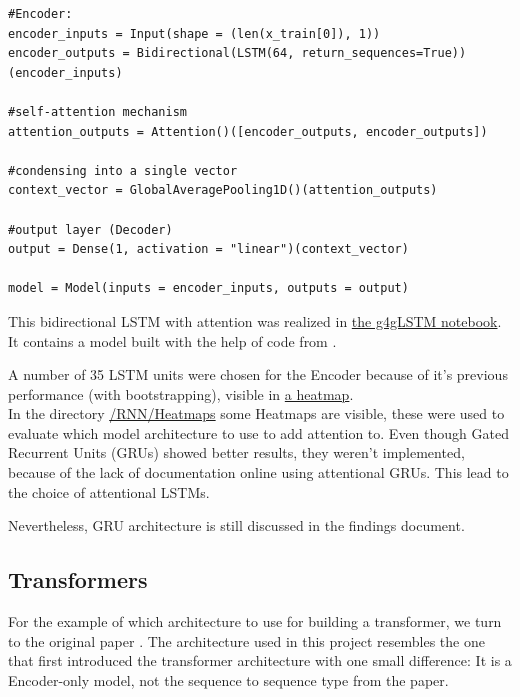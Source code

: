 \documentclass{article}
\begin{document}
\begin{Verbatim}
#Encoder:
encoder_inputs = Input(shape = (len(x_train[0]), 1))
encoder_outputs = Bidirectional(LSTM(64, return_sequences=True))(encoder_inputs)

#self-attention mechanism
attention_outputs = Attention()([encoder_outputs, encoder_outputs])

#condensing into a single vector
context_vector = GlobalAveragePooling1D()(attention_outputs)

#output layer (Decoder)
output = Dense(1, activation = "linear")(context_vector)

model = Model(inputs = encoder_inputs, outputs = output)
\end{Verbatim}

This bidirectional LSTM with attention was realized in \href{https://github.com/AntonStantan/matura/blob/main/attentional-RNN/g4gLSTM.ipynb}
{the g4gLSTM notebook}. It contains a model built with the help of code from 
\cite{geeksforgeeks_attention_bilstm}. 

A number of 35 LSTM units were chosen for the Encoder because of it's previous 
performance (with bootstrapping), visible in \href{https://github.com/AntonStantan/matura/blob/main/attentional-RNN/previousHeatmap.png}
{a heatmap}.
\\[2em]
In the directory \href{https://github.com/AntonStantan/matura/tree/main/RNN/Heatmaps}
{/RNN/Heatmaps} some Heatmaps are visible, these were used to evaluate which 
model architecture to use to add attention to. Even though Gated Recurrent 
Units (GRUs) showed better results, they weren't implemented, because of the 
lack of documentation online using attentional GRUs. This lead to the choice 
of attentional LSTMs.

Nevertheless, GRU architecture is still discussed in the findings document.

\newpage
\subsection{Transformers}

For the example of which architecture to use for building a transformer, we 
turn to the original paper \cite{vaswani2023attentionneed}. The architecture 
used in this project resembles the one that first introduced the transformer 
architecture with one small difference: It is a Encoder-only model, not the 
sequence to sequence type from the paper.
\end{document}
